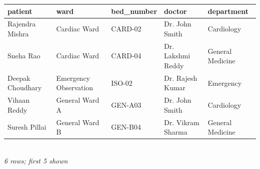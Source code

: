 {\scriptsize\setlength{\tabcolsep}{2.5pt}\begin{tabular}{lllll}\toprule
\textbf{patient} & \textbf{ward} & \textbf{bed\_number} & \textbf{doctor} & \textbf{department} \\\midrule
Rajendra Mishra & Cardiac Ward & CARD-02 & Dr. John Smith & Cardiology \\
Sneha Rao & Cardiac Ward & CARD-04 & Dr. Lakshmi Reddy & General Medicine \\
Deepak Choudhary & Emergency Observation & ISO-02 & Dr. Rajesh Kumar & Emergency \\
Vihaan Reddy & General Ward A & GEN-A03 & Dr. John Smith & Cardiology \\
Suresh Pillai & General Ward B & GEN-B04 & Dr. Vikram Sharma & General Medicine \\
\bottomrule\end{tabular}}\\[-1pt]{\tiny\itshape 6 rows; first 5 shown}
